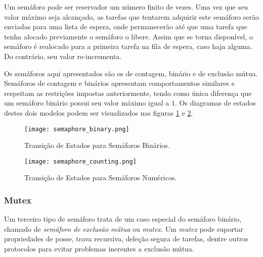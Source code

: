 Um semáforo pode ser reservador um número finito de vezes. Uma vez que seu valor máximo seja alcançado, as tarefas que tentarem adquirir este semáforo serão enviadas para uma lista de espera, onde permanecerão até que uma tarefa que tenha alocado previamente o semáforo o libere. Assim que se torna disponível, o semáforo é realocado para a primeira tarefa na fila de espera, caso haja alguma. Do contrário, seu valor re-incrementa.

Os semáforos aqui apresentados são os de contagem, binário e de exclusão mútua. Semáforos de contagem e binários apresentam comportamentos similares e respeitam as restrições impostas anteriormente, tendo como única diferença que um semáforo binário possui seu valor máximo igual a $1$. Os diagramas de estados destes dois modelos podem ser visualizados nas figuras \ref{fig:semaphore_binary} e \ref{fig:semaphore_counting}.

\begin{figure}[htb]
	\centering
	\texttt{[image: semaphore\_binary.png]}
	\caption{Transição de Estados para Semáforos Binários.}
	\label{fig:semaphore_binary}
\end{figure}

\begin{figure}[htb]
	\centering
	\texttt{[image: semaphore\_counting.png]}
	\caption{Transição de Estados para Semáforos Numéricos.}
	\label{fig:semaphore_counting}
\end{figure}

\subsubsection{Mutex}

Um terceiro tipo de semáforo trata de um caso especial do semáforo binário, chamado de \emph{semáforo de exclusão mútua} ou \emph{mutex}.  Um \emph{mutex} pode suportar propriedades de posse, trava recursiva, deleção segura de tarefas, dentre outros protocolos para evitar problemas inerentes a exclusão mútua.

\pagebreak


